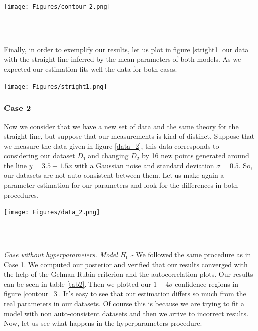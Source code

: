 \documentclass[onecolumn,           %
               showpacs,            %
               preprintnumbers,     %
               aps,                 %
               letterpaper,             %
               superscriptaddress,      %
               nofootinbib,         %
               tightenlines,        %
               floats,floatfix      %
               ,usenatbib,
               ]{revtex4-1}
\begin{document}
\begin{minipage}{\textwidth}
\centering
\texttt{[image: Figures/contour\_2.png]}
\label{contour_2}
\end{minipage}\\ $ $

Finally, in order to exemplify our results, let us plot in figure \ref{stright1} our data with the straight-line inferred by the mean parameters of both models. As we expected our estimation fits well the data for both cases.  

\begin{minipage}{\textwidth}
\centering
\texttt{[image: Figures/stright1.png]}
\label{stright1}
\end{minipage}

\subsubsection{Case 2}

Now we consider that we have a new set of data and the same theory for the straight-line, but suppose that our measurements is kind of distinct. Suppose that we measure the data given in  figure \ref{data_2}, this data corresponds to considering our dataset $D_1$ and changing $D_2$ by 16 new points generated around the line $y=3.5+1.5x$ with a Gaussian noise and standard deviation $\sigma = 0.5$. So, our datasets are not auto-consistent between them. Let us make again a parameter estimation for our parameters and look for the differences in both procedures.

\begin{minipage}{\textwidth}
\centering
\texttt{[image: Figures/data\_2.png]}
\label{data_2}
\end{minipage}\\ $ $

\textit{Case without hyperparameters. Model $H_0$.-} We followed the same procedure as in Case 1. We computed our posterior and verified that our results converged with the help of the Gelman-Rubin criterion and the autocorrelation plots. Our results can be seen in table \ref{tab2}. Then we plotted our $1-4 \sigma$ confidence regions in figure \ref{contour_3}. It's easy to see that our estimation differs so much from the real parameters in our datasets. Of course this is because we are trying to fit a model with non auto-consistent datasets and then we arrive to incorrect results. Now, let us see what happens in the hyperparameters procedure.    
\end{document}
